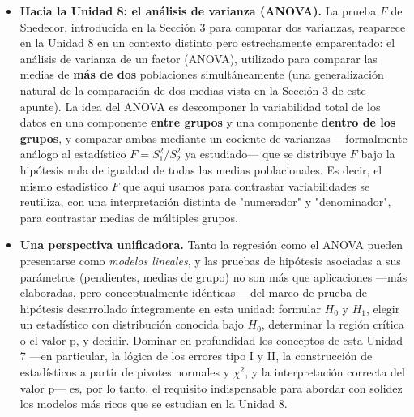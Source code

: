 \documentclass[11pt,a4paper]{article}
\theoremstyle{plain}
\theoremstyle{definition}
\theoremstyle{remark}
\begin{document}
\begin{itemize}[nosep]
\item \textbf{Hacia la Unidad 8: el análisis de varianza (ANOVA).} La prueba $F$ de Snedecor, introducida en la Sección 3 para comparar dos varianzas, reaparece en la Unidad 8 en un contexto distinto pero estrechamente emparentado: el análisis de varianza de un factor (ANOVA), utilizado para comparar las medias de \textbf{más de dos} poblaciones simultáneamente (una generalización natural de la comparación de dos medias vista en la Sección 3 de este apunte). La idea del ANOVA es descomponer la variabilidad total de los datos en una componente \textbf{entre grupos} y una componente \textbf{dentro de los grupos}, y comparar ambas mediante un cociente de varianzas —formalmente análogo al estadístico $F=S_1^2/S_2^2$ ya estudiado— que se distribuye $F$ bajo la hipótesis nula de igualdad de todas las medias poblacionales. Es decir, el mismo estadístico $F$ que aquí usamos para contrastar variabilidades se reutiliza, con una interpretación distinta de "numerador" y "denominador", para contrastar medias de múltiples grupos.
\item \textbf{Una perspectiva unificadora.} Tanto la regresión como el ANOVA pueden presentarse como \emph{modelos lineales}, y las pruebas de hipótesis asociadas a sus parámetros (pendientes, medias de grupo) no son más que aplicaciones —más elaboradas, pero conceptualmente idénticas— del marco de prueba de hipótesis desarrollado íntegramente en esta unidad: formular $H_0$ y $H_1$, elegir un estadístico con distribución conocida bajo $H_0$, determinar la región crítica o el valor p, y decidir. Dominar en profundidad los conceptos de esta Unidad 7 —en particular, la lógica de los errores tipo I y II, la construcción de estadísticos a partir de pivotes normales y $\chi^2$, y la interpretación correcta del valor p— es, por lo tanto, el requisito indispensable para abordar con solidez los modelos más ricos que se estudian en la Unidad 8.
\end{itemize}
\end{document}
